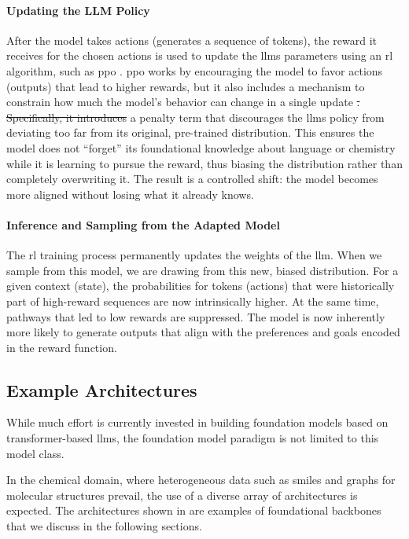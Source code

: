 \documentclass[11pt, oneside]{article}
\makeatletter
\providecommand{\DIFaddtex}[1]{{\protect\color{blue}\uwave{#1}}} %
\providecommand{\DIFdeltex}[1]{{\protect\color{red}\sout{#1}}} %
\providecommand{\DIFaddbegin}{} %
\providecommand{\DIFaddend}{} %
\providecommand{\DIFdelbegin}{} %
\providecommand{\DIFdelend}{} %
\providecommand{\DIFadd}[1]{\texorpdfstring{\DIFaddtex{#1}}{#1}} %
\providecommand{\DIFdel}[1]{\texorpdfstring{\DIFdeltex{#1}}{}} %
\newcommand{\DIFscaledelfig}{0.5}
\newlength{\DIFdelgraphicswidth} %
\newlength{\DIFdelgraphicsheight} %
\newcommand{\DIFaddincludegraphics}[2][]{{\color{blue}\fbox{\DIFOincludegraphics[#1]{#2}}}} %
\newcommand{\DIFdelincludegraphics}[2][]{%
\sbox{\DIFdelgraphicsbox}{\DIFOincludegraphics[#1]{#2}}%
\settoboxwidth{\DIFdelgraphicswidth}{\DIFdelgraphicsbox} %
\settoboxtotalheight{\DIFdelgraphicsheight}{\DIFdelgraphicsbox} %
\scalebox{\DIFscaledelfig}{%
\parbox[b]{\DIFdelgraphicswidth}{\usebox{\DIFdelgraphicsbox}\\[-\baselineskip] \rule{\DIFdelgraphicswidth}{0em}}\llap{\resizebox{\DIFdelgraphicswidth}{\DIFdelgraphicsheight}{%
\setlength{\unitlength}{\DIFdelgraphicswidth}%
\begin{picture}(1,1)%
\thicklines\linethickness{2pt} %
{\color[rgb]{1,0,0}\put(0,0){\framebox(1,1){}}}%
{\color[rgb]{1,0,0}\put(0,0){\line( 1,1){1}}}%
{\color[rgb]{1,0,0}\put(0,1){\line(1,-1){1}}}%
\end{picture}%
}\hspace*{3pt}}} %
} %
\DeclareRobustCommand{\DIFaddbegin}{\DIFOaddbegin \let\includegraphics\DIFaddincludegraphics} %
\DeclareRobustCommand{\DIFaddend}{\DIFOaddend \let\includegraphics\DIFOincludegraphics} %
\DeclareRobustCommand{\DIFdelbegin}{\DIFOdelbegin \let\includegraphics\DIFdelincludegraphics} %
\DeclareRobustCommand{\DIFdelend}{\DIFOaddend \let\includegraphics\DIFOincludegraphics} %
\let\sout@orig\sout %
\renewcommand{\sout}[1]{\ifmmode\text{\sout@orig{\ensuremath{#1}}}\else\sout@orig{#1}\fi} %
\makeatother
\begin{document}
\DIFaddend \paragraph{Updating the LLM Policy} 
After the model takes actions (generates a sequence of tokens), the reward it receives for the chosen actions is used to update the \glspl{llm} parameters using an \gls{rl} algorithm, such as \gls{ppo} \autocite{schulman2017proximal}.
\gls{ppo} works by encouraging the model to favor actions (outputs) that lead to higher rewards, but it also includes a mechanism to constrain how much the model's behavior can change in a single update \DIFdelbegin \DIFdel{. 
Specifically, it introduces }\DIFdelend \DIFaddbegin \DIFadd{by introducing s }\DIFaddend a penalty term that discourages the \glspl{llm} policy from deviating too far from its original, pre-trained distribution. 
This ensures the model does not \enquote{forget} its foundational knowledge about language or chemistry while it is learning to pursue the reward, thus biasing the distribution rather than completely overwriting it. 
The result is a controlled shift: the model becomes more aligned without losing what it already knows.


\paragraph{Inference and Sampling from the Adapted Model}

The \gls{rl} training process permanently updates the weights of the \gls{llm}. 
When we sample from this model, we are drawing from this new, biased distribution. 
For a given context (state), the probabilities for tokens (actions) that were historically part of high-reward sequences are now intrinsically higher. 
At the same time, pathways that led to low rewards are suppressed. 
The model is now inherently more likely to generate outputs that align with the preferences and goals encoded in the reward function.

\subsection{Example Architectures} \label{sec:example_architectures}
While much effort is currently invested in building foundation models based on transformer-based \glspl{llm}, the foundation model paradigm is not limited to this model class.

In the chemical domain, where heterogeneous data such as \gls{smiles} and graphs for molecular structures prevail, the use of a diverse array of architectures is expected.
The architectures shown in  are examples of foundational backbones that we discuss in the following sections.
\end{document}
